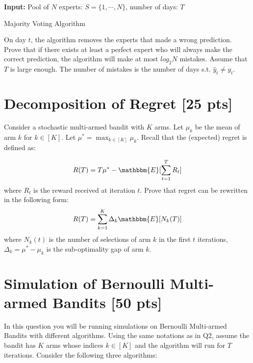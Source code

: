\documentclass{article}
\begin{document}
\begin{algorithm}[H]
\SetAlgoLined
\textbf{Input:} Pool of $N$ experts: $S=\{1,\cdots, N\}$, number of days: $T$ \\

\vspace{2mm}
\caption{Majority Voting Algorithm}
\end{algorithm}
\vspace{3mm}
On day $t$, the algorithm removes the experts that made a wrong prediction. Prove that if there exists at least a perfect expert who will always make the correct prediction, the algorithm will make at most $log_2N$ mistakes. Assume that $T$ is large enough. The number of mistakes is the number of days s.t. $\hat{y}_t \neq y_t$.



\newpage
\section{Decomposition of Regret [25 pts]}
Consider a stochastic multi-armed bandit with $K$ arms. Let $\mu_k$ be the mean of arm $k$ for $k\in [K]$. Let $\mu^{*}=\max_{k\in[K]}\mu_k$. Recall that the (expected) regret is defined as:

\begin{equation*}
    R(T) = T\mu^{*} - \mathbbm{E}[\sum_{t=1}^TR_t]
\end{equation*}
where $R_t$ is the reward received at iteration $t$. Prove that regret can be rewritten in the following form:
\begin{equation*}
    R(T) = \sum_{k=1}^K \Delta_k \mathbbm{E}[N_k(T)]
\end{equation*}
where $N_k(t)$ is the number of selections of arm $k$ in the first $t$ iterations, $\Delta_k = \mu^{*} -\mu_k$ is the sub-optimality gap of arm $k$.




\newpage
\section{Simulation of Bernoulli Multi-armed Bandits [50 pts]}
In this question you will be running simulations on Bernoulli Multi-armed Bandits with different algorithms. Using the same notations as in Q2, assume the bandit has $K$ arms whose indices $k\in [K]$ and the algorithm will run for $T$ iterations.  Consider the following three algorithms:
\end{document}
